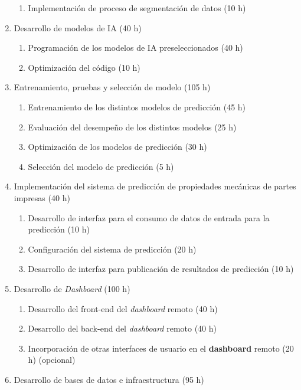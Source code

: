 \documentclass[
11pt, %
]{charter}
\begin{document}
\begin{enumerate}
\begin{enumerate}
        \item Implementación de proceso de segmentación de datos (10 h)
    \end{enumerate}
    \item Desarrollo de modelos de IA (40 h)
    \begin{enumerate}
        \item Programación de los modelos de IA preseleccionados (40 h)
        \item Optimización del código (10 h)
    \end{enumerate}
    \item Entrenamiento, pruebas y selección de modelo (105 h)
    \begin{enumerate}
        \item Entrenamiento de los distintos modelos de predicción (45 h)
        \item Evaluación del desempeño de los distintos modelos (25 h)
        \item Optimización de los modelos de predicción (30 h)
        \item Selección del modelo de predicción (5 h)
    \end{enumerate}
    \item Implementación del sistema de predicción de propiedades mecánicas de partes impresas (40 h)
    \begin{enumerate}
        \item Desarrollo de interfaz para el consumo de datos de entrada para la predicción (10 h)
        \item Configuración del sistema de predicción (20 h)
        \item Desarrollo de interfaz para publicación de resultados de predicción (10 h)
    \end{enumerate}
    \item Desarrollo de \textit{Dashboard} (100 h)
    \begin{enumerate}
        \item Desarrollo del front-end del \textit{dashboard} remoto (40 h)
        \item Desarrollo del back-end del \textit{dashboard} remoto (40 h) 
        \item Incorporación de otras interfaces de usuario en el \textbf{dashboard} remoto (20 h) (opcional)
    \end{enumerate}
    \item Desarrollo de bases de datos e infraestructura (95 h)
    \begin{enumerate}

\end{enumerate}
\end{enumerate}
\end{document}
